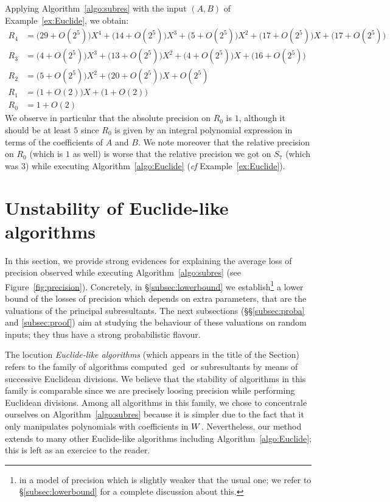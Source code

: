 \documentclass{article}
\begin{document}
\begin{ex}
\label{ex:subres}
Applying Algorithm~\ref{algo:subres} with the input $(A,B)$ of 
Example~\ref{ex:Euclide}, we obtain:
\begin{align*}
R_4 & = 
  \big(29 + O(2^5)\big) X^4 + 
  \big(14 + O(2^5)\big) X^3 + 
  \big(5 + O(2^5)\big) X^2 + 
  \big(17 + O(2^5)\big) X + 
  \big(17 + O(2^5)\big) \\
R_3 & = 
  \big(4 + O(2^5)\big) X^3 + 
  \big(13 + O(2^5)\big) X^2 + 
  \big(4 + O(2^5)\big) X + 
  \big(16 + O(2^5)\big) \\
R_2 & = 
  \big(5 + O(2^5)\big) X^2 + 
  \big(20 + O(2^5)\big) X + 
  O(2^5) \\
R_1 & = 
  \big(1 + O(2)\big) X + 
  \big(1 + O(2)\big) \\
R_0 & = 1 + O(2)
\end{align*}
We observe in particular that the absolute precision on $R_0$ is $1$, 
although it should be at least $5$ since $R_0$ is given by an integral
polynomial expression in terms of the coefficients of $A$ and $B$. We
note moreover that the relative precision on $R_0$ (which is $1$ as
well) is worse that the relative precision we got on $S_7$ (which was
$3$) while executing Algorithm~\ref{algo:Euclide} (\emph{cf} 
Example~\ref{ex:Euclide}).
\end{ex}

\section{Unstability of Euclide-like algorithms}
\label{sec:unstable}

In this section, we provide strong evidences for explaining the average 
loss of precision observed while executing Algorithm~\ref{algo:subres} 
(see Figure~\ref{fig:precision}).
Concretely, in \S \ref{subsec:lowerbound} we establish\footnote{in a 
model of precision which is slightly weaker that the usual one; we refer 
to \S \ref{subsec:lowerbound} for a complete discussion about this.} a 
lower bound of the losses of precision which depends on extra 
parameters, that are the valuations of the principal subresultants. 
The next subsections (\S\S \ref{subsec:proba} and \ref{subsec:proof})
aim at studying the behaviour of these valuations on random inputs;
they thus have a strong probabilistic flavour.

\begin{rem}
The locution \emph{Euclide-like algorithms} (which appears in the 
title of the Section) refers to the family of
algorithms computed $\gcd$ or subresultants by means of successive
Euclidean divisions. We believe that the stability of algorithms in
this family is comparable since we are precisely loosing precision
while performing Euclidean divisions.
Among all algorithms in this family, we chose to concentrale ourselves
on Algorithm~\ref{algo:subres} because it is simpler due to the fact
that it only manipulates polynomials with coefficients in $W$.
Nevertheless, our method extends to many other Euclide-like algorithms
including Algorithm~\ref{algo:Euclide}; this is left as an exercice to
the reader.
\end{rem}
\end{document}
